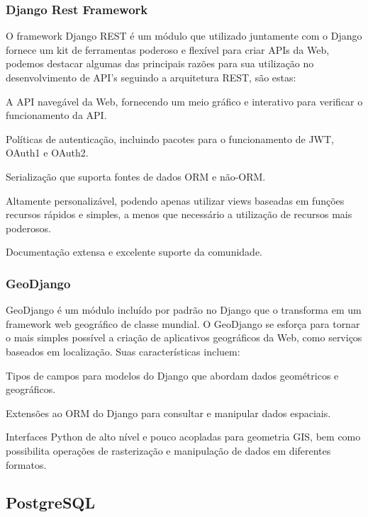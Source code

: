 {{{{{{{\subsubsection{Django Rest Framework}

O framework Django REST é um módulo que utilizado juntamente com o Django fornece um kit de ferramentas poderoso e flexível para criar APIs da Web, podemos destacar algumas das principais razões para sua utilização no desenvolvimento de API's seguindo a arquitetura REST, são estas:

\begin{lista}
\item A API navegável da Web, fornecendo um meio gráfico e interativo para verificar o funcionamento da API.
\item Políticas de autenticação, incluindo pacotes para o funcionamento de JWT, OAuth1 e OAuth2.
\item Serialização que suporta fontes de dados ORM e não-ORM.
\item Altamente personalizável, podendo apenas utilizar views baseadas em funções recursos rápidos e simples, a menos que necessário a utilização de recursos mais poderosos.
\item Documentação extensa e excelente suporte da comunidade.
\end{lista}

\subsubsection{GeoDjango}

GeoDjango é um módulo incluído por padrão no Django que o transforma em um framework web geográfico de classe mundial. O GeoDjango se esforça para tornar o mais simples possível a criação de aplicativos geográficos da Web, como serviços baseados em localização. Suas características incluem:

\begin{lista}
\item Tipos de campos para modelos do Django que abordam dados geométricos e geográficos.
\item Extensões ao ORM do Django para consultar e manipular dados espaciais.
\item Interfaces Python de alto nível e pouco acopladas para geometria GIS, bem como possibilita operações de rasterização e manipulação de dados em diferentes formatos.
\end{lista}

\subsection{PostgreSQL}

}}}}}}}
